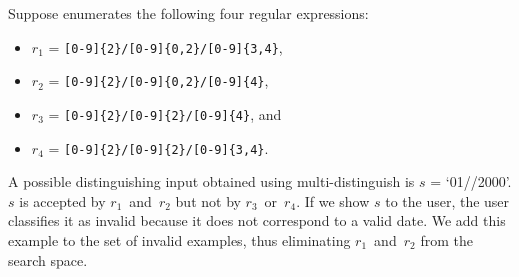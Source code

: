 \begin{example}
Suppose \Forest{} enumerates the following four regular expressions:
\begin{itemize}[label={},nosep]
    \item \(r_1\) = \verb`[0-9]{2}/[0-9]{0,2}/[0-9]{3,4}`,
    \item \(r_2\) = \verb`[0-9]{2}/[0-9]{0,2}/[0-9]{4}`,
    \item \(r_3\) = \verb`[0-9]{2}/[0-9]{2}/[0-9]{4}`, and
    \item \(r_4\) = \verb`[0-9]{2}/[0-9]{2}/[0-9]{3,4}`.
\end{itemize}
%
A possible distinguishing input obtained using multi-distinguish is \(s\) = `01//2000'. \(s\) is accepted by \(r_1\)~and~\(r_2\) but not by \(r_3\)~or~\(r_4\). If we show \(s\) to the user, the user classifies it as invalid because it does not correspond to a valid date. We add this example to the set of invalid examples, thus eliminating \(r_1\)~and~\(r_2\) from the search space.
\end{example}

